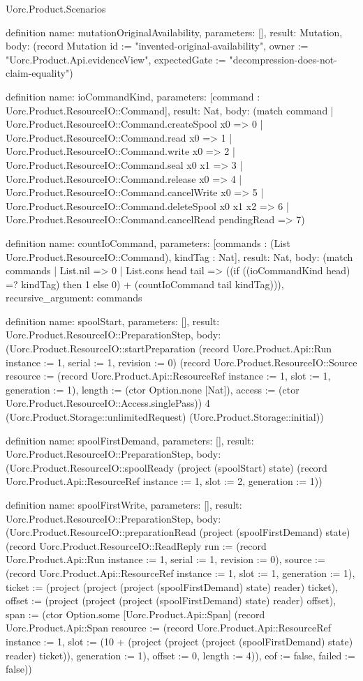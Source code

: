 \begin{lexlean}{Uorc.Product.Scenarios}
\begin{semanticmodule}
definition{
  name: mutationOriginalAvailability,
  parameters: [],
  result: Mutation,
  body: (record Mutation {id := "invented-original-availability", owner := "Uorc.Product.Api.evidenceView", expectedGate := "decompression-does-not-claim-equality"})
}

definition{
  name: ioCommandKind,
  parameters: [command : Uorc.Product.ResourceIO::Command],
  result: Nat,
  body: (match command
    | Uorc.Product.ResourceIO::Command.createSpool x0 => 0
    | Uorc.Product.ResourceIO::Command.read x0 => 1
    | Uorc.Product.ResourceIO::Command.write x0 => 2
    | Uorc.Product.ResourceIO::Command.seal x0 x1 => 3
    | Uorc.Product.ResourceIO::Command.release x0 => 4
    | Uorc.Product.ResourceIO::Command.cancelWrite x0 => 5
    | Uorc.Product.ResourceIO::Command.deleteSpool x0 x1 x2 => 6
    | Uorc.Product.ResourceIO::Command.cancelRead pendingRead => 7)
}

definition{
  name: countIoCommand,
  parameters: [commands : (List Uorc.Product.ResourceIO::Command), kindTag : Nat],
  result: Nat,
  body: (match commands
    | List.nil => 0
    | List.cons head tail => ((if ((ioCommandKind head) =? kindTag) then 1 else 0) + (countIoCommand tail kindTag))),
  recursive_argument: commands
}

definition{
  name: spoolStart,
  parameters: [],
  result: Uorc.Product.ResourceIO::PreparationStep,
  body: (Uorc.Product.ResourceIO::startPreparation (record Uorc.Product.Api::Run {instance := 1, serial := 1, revision := 0}) (record Uorc.Product.ResourceIO::Source {resource := (record Uorc.Product.Api::ResourceRef {instance := 1, slot := 1, generation := 1}), length := (ctor Option.none [Nat]), access := (ctor Uorc.Product.ResourceIO::Access.singlePass)}) 4 (Uorc.Product.Storage::unlimitedRequest) (Uorc.Product.Storage::initial))
}

definition{
  name: spoolFirstDemand,
  parameters: [],
  result: Uorc.Product.ResourceIO::PreparationStep,
  body: (Uorc.Product.ResourceIO::spoolReady (project (spoolStart) state) (record Uorc.Product.Api::ResourceRef {instance := 1, slot := 2, generation := 1}))
}

definition{
  name: spoolFirstWrite,
  parameters: [],
  result: Uorc.Product.ResourceIO::PreparationStep,
  body: (Uorc.Product.ResourceIO::preparationRead (project (spoolFirstDemand) state) (record Uorc.Product.ResourceIO::ReadReply {run := (record Uorc.Product.Api::Run {instance := 1, serial := 1, revision := 0}), source := (record Uorc.Product.Api::ResourceRef {instance := 1, slot := 1, generation := 1}), ticket := (project (project (project (spoolFirstDemand) state) reader) ticket), offset := (project (project (project (spoolFirstDemand) state) reader) offset), span := (ctor Option.some [Uorc.Product.Api::Span] (record Uorc.Product.Api::Span {resource := (record Uorc.Product.Api::ResourceRef {instance := 1, slot := (10 + (project (project (project (spoolFirstDemand) state) reader) ticket)), generation := 1}), offset := 0, length := 4})), eof := false, failed := false}))
}


\end{semanticmodule}
\end{lexlean}
